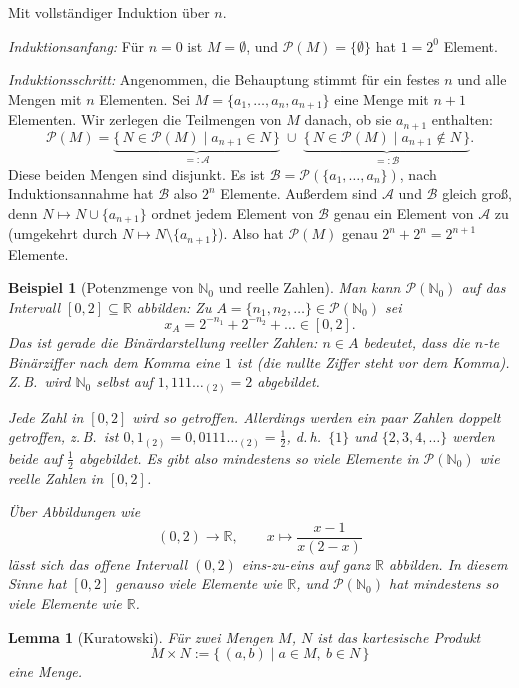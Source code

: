 \documentclass[a4paper]{article}
\makeatletter
\theoremstyle{kurzskript}
\newtheorem{lemma}[satz]{Lemma}
\newtheorem*{bsp}{Beispiel}
\renewenvironment{proof}[1][\proofname]{\par\pushQED{\qed}%
  \normalfont\topsep\medskipamount\relax
  \trivlist\item[\hskip\labelsep\bfseries #1\@addpunct{.}]\ignorespaces}%
  {\popQED\endtrivlist\@endpefalse}
\renewcommand{\proofname}{Beweis}
\newcommand{\N}{\mathbb{N}}
\newcommand{\R}{\mathbb{R}}
\newcommand{\Pot}{\mathcal{P}}
\makeatother
\begin{document}
\begin{proof}
Mit vollständiger Induktion über $n$.

\emph{Induktionsanfang:} Für $n = 0$ ist $M = \emptyset$, und $\Pot(M) = \{\emptyset\}$ hat $1 = 2^0$ Element.

\emph{Induktionsschritt:} Angenommen, die Behauptung stimmt für ein festes $n$ und alle Mengen mit $n$ Elementen. Sei $M = \{a_1, \dots, a_n, a_{n+1}\}$ eine Menge mit $n + 1$ Elementen. Wir zerlegen die Teilmengen von $M$ danach, ob sie $a_{n+1}$ enthalten:
\[
  \Pot(M) = \underbrace{\{\, N \in \Pot(M) \mid a_{n+1} \in N \,\}}_{=: \mathcal{A}} \;\cup\; \underbrace{\{\, N \in \Pot(M) \mid a_{n+1} \notin N \,\}}_{=: \mathcal{B}}.
\]
Diese beiden Mengen sind disjunkt. Es ist $\mathcal{B} = \Pot(\{a_1, \dots, a_n\})$, nach Induktionsannahme hat $\mathcal{B}$ also $2^n$ Elemente. Außerdem sind $\mathcal{A}$ und $\mathcal{B}$ gleich groß, denn $N \mapsto N \cup \{a_{n+1}\}$ ordnet jedem Element von $\mathcal{B}$ genau ein Element von $\mathcal{A}$ zu (umgekehrt durch $N \mapsto N \setminus \{a_{n+1}\}$). Also hat $\Pot(M)$ genau $2^n + 2^n = 2^{n+1}$ Elemente.
\end{proof}

\begin{bsp}[Potenzmenge von $\N_0$ und reelle Zahlen]
Man kann $\Pot(\N_0)$ auf das Intervall $[0, 2] \subseteq \R$ abbilden: Zu $A = \{n_1, n_2, \dots\} \in \Pot(\N_0)$ sei
\[
  x_A = 2^{-n_1} + 2^{-n_2} + \dots \in [0, 2].
\]
Das ist gerade die Binärdarstellung reeller Zahlen: $n \in A$ bedeutet, dass die $n$-te Binärziffer nach dem Komma eine $1$ ist (die nullte Ziffer steht vor dem Komma). Z.\,B.\ wird $\N_0$ selbst auf $1{,}111\ldots_{(2)} = 2$ abgebildet.

Jede Zahl in $[0, 2]$ wird so getroffen. Allerdings werden ein paar Zahlen doppelt getroffen, z.\,B.\ ist $0{,}1_{(2)} = 0{,}0111\ldots_{(2)} = \frac12$, d.\,h.\ $\{1\}$ und $\{2, 3, 4, \dots\}$ werden beide auf $\frac12$ abgebildet. Es gibt also mindestens so viele Elemente in $\Pot(\N_0)$ wie reelle Zahlen in $[0, 2]$.

Über Abbildungen wie
\[
  (0, 2) \to \R, \qquad x \mapsto \frac{x - 1}{x(2 - x)}
\]
lässt sich das offene Intervall $(0, 2)$ eins-zu-eins auf ganz $\R$ abbilden. In diesem Sinne hat $[0, 2]$ genauso viele Elemente wie $\R$, und $\Pot(\N_0)$ hat mindestens so viele Elemente wie $\R$.
\end{bsp}

\begin{lemma}[Kuratowski]
Für zwei Mengen $M$, $N$ ist das \emph{kartesische Produkt}
\[
  M \times N := \{\, (a, b) \mid a \in M,\ b \in N \,\}
\]
eine Menge.
\end{lemma}
\end{document}

